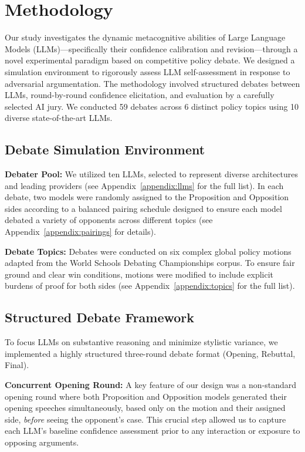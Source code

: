 \documentclass{article}
\begin{document}
\section{Methodology}
\label{sec:methodology}

Our study investigates the dynamic metacognitive abilities of Large Language Models (LLMs)---specifically their confidence calibration and revision---through a novel experimental paradigm based on competitive policy debate. We designed a simulation environment to rigorously assess LLM self-assessment in response to adversarial argumentation. The methodology involved structured debates between LLMs, round-by-round confidence elicitation, and evaluation by a carefully selected AI jury. We conducted 59 debates across 6 distinct policy topics using 10 diverse state-of-the-art LLMs.

\subsection{Debate Simulation Environment}
\label{subsec:debate_env}

\textbf{Debater Pool:} We utilized ten LLMs, selected to represent diverse architectures and leading providers (see Appendix~\ref{appendix:llms} for the full list). In each debate, two models were randomly assigned to the Proposition and Opposition sides according to a balanced pairing schedule designed to ensure each model debated a variety of opponents across different topics (see Appendix~\ref{appendix:pairings} for details).

\textbf{Debate Topics:} Debates were conducted on six complex global policy motions adapted from the World Schools Debating Championships corpus. To ensure fair ground and clear win conditions, motions were modified to include explicit burdens of proof for both sides (see Appendix~\ref{appendix:topics} for the full list).

\subsection{Structured Debate Framework}
\label{subsec:debate_framework}

To focus LLMs on substantive reasoning and minimize stylistic variance, we implemented a highly structured three-round debate format (Opening, Rebuttal, Final).

\textbf{Concurrent Opening Round:} A key feature of our design was a non-standard opening round where both Proposition and Opposition models generated their opening speeches simultaneously, based only on the motion and their assigned side, \textit{before} seeing the opponent's case. This crucial step allowed us to capture each LLM's baseline confidence assessment prior to any interaction or exposure to opposing arguments.
\end{document}
